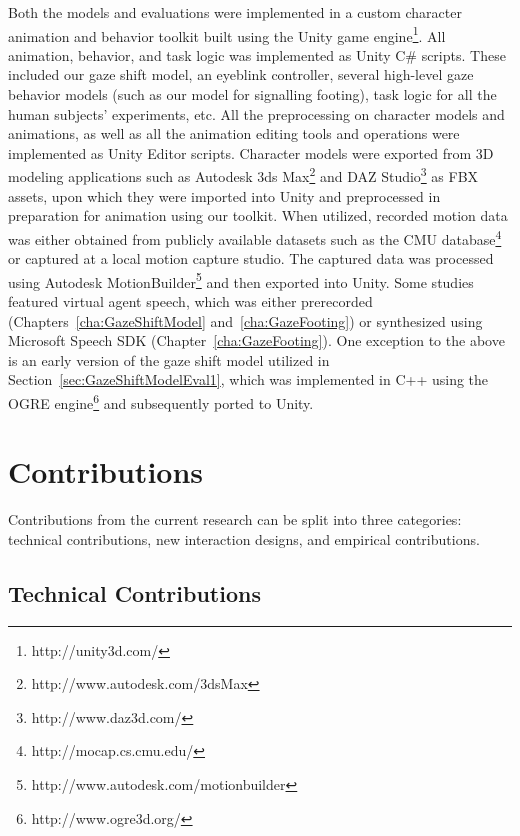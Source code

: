 Both the models and evaluations were implemented in a custom character animation and behavior toolkit built using the Unity game engine\footnote{http://unity3d.com/}. All animation, behavior, and task logic was implemented as Unity C\# scripts. These included our gaze shift model, an eyeblink controller, several high-level gaze behavior models (such as our model for signalling footing), task logic for all the human subjects' experiments, etc. All the preprocessing on character models and animations, as well as all the animation editing tools and operations were implemented as Unity Editor scripts. Character models were exported from 3D modeling applications such as Autodesk 3ds Max\footnote{http://www.autodesk.com/3dsMax} and DAZ Studio\footnote{http://www.daz3d.com/} as FBX assets, upon which they were imported into Unity and preprocessed in preparation for animation using our toolkit. When utilized, recorded motion data was either obtained from publicly available datasets such as the CMU database\footnote{http://mocap.cs.cmu.edu/} or captured at a local motion capture studio. The captured data was processed using Autodesk MotionBuilder\footnote{http://www.autodesk.com/motionbuilder} and then exported into Unity. Some studies featured virtual agent speech, which was either prerecorded (Chapters~\ref{cha:GazeShiftModel} and~\ref{cha:GazeFooting}) or synthesized using Microsoft Speech SDK (Chapter~\ref{cha:GazeFooting}). One exception to the above is an early version of the gaze shift model utilized in Section~\ref{sec:GazeShiftModelEval1}, which was implemented in C++ using the OGRE engine\footnote{http://www.ogre3d.org/} and subsequently ported to Unity.

\section{Contributions}

Contributions from the current research can be split into three categories: technical contributions, new interaction designs, and empirical contributions.

\subsection{Technical Contributions}

